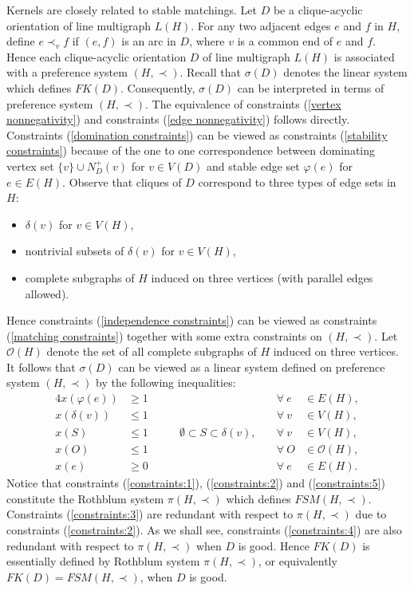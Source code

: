 \documentclass[11pt]{article}
\numberwithin{theorem}{section}
\begin{document}
Kernels are closely related to stable matchings. Let $D$ be a clique-acyclic orientation of line multigraph $L(H)$. 
For any two adjacent edges $e$ and $f$ in $H$, define $e\prec_v f$ if $(e,f)$ is an arc in $D$, where $v$ is a common end of $e$ and $f$.
Hence each clique-acyclic orientation $D$ of line multigraph $L(H)$ is associated with a preference system $(H,\prec)$.
Recall that $\sigma(D)$ denotes the linear system which defines $FK(D)$. Consequently, $\sigma(D)$ can be interpreted in terms of preference system $(H,\prec)$. The equivalence of constraints (\ref{vertex nonnegativity}) and constraints (\ref{edge nonnegativity}) follows directly. Constraints (\ref{domination constraints}) can be viewed as constraints (\ref{stability constraints}) because of the one to one correspondence between dominating vertex set $\{v\}\cup N^+_D(v)$ for $v\in V(D)$ and stable edge set $\varphi(e)$ for $e\in E(H)$.
Observe that cliques of $D$ correspond to three types of edge sets in $H$:
\begin{itemize}
\item $\delta(v)$ for $v\in V(H)$,
\item nontrivial subsets of $\delta(v)$ for $v\in V(H)$,
\item complete subgraphs of $H$ induced on three vertices (with parallel edges allowed).
\end{itemize}
Hence constraints (\ref{independence constraints}) can be viewed as constraints (\ref{matching constraints}) together with some extra constraints on $(H,\prec)$. Let $\mathcal{O}(H)$ denote the set of all complete subgraphs of $H$ induced on three vertices. It follows that $\sigma(D)$ can be viewed as a linear system defined on preference system $(H,\prec)$ by the following inequalities:
\begin{alignat}{4}
x(\varphi(e)) &\geq 1 &\qquad &\forall ~e &\in E(H),\label{constraints:1}\\
x(\delta(v)) &\leq 1 &\qquad &\forall ~v &\in V(H),\label{constraints:2}\\
x(S) &\leq 1 &\qquad \emptyset\subset S\subset \delta(v),\quad &\forall ~v&\in V(H),\label{constraints:3}\\
x(O) &\leq 1 &\qquad &\forall ~O&\in \mathcal{O}(H),\label{constraints:4}\\
x(e) &\geq 0 &\qquad &\forall ~e &\in E(H)\label{constraints:5}.
\end{alignat}
Notice that constraints (\ref{constraints:1}), (\ref{constraints:2}) and (\ref{constraints:5}) constitute the Rothblum system $\pi(H,\prec)$ which defines $FSM(H,\prec)$. Constraints (\ref{constraints:3}) are redundant with respect to $\pi(H,\prec)$ due to constraints (\ref{constraints:2}). As we shall see, constraints (\ref{constraints:4}) are also redundant with respect to $\pi(H,\prec)$ when $D$ is good. Hence $FK(D)$ is essentially defined by Rothblum system $\pi(H,\prec)$, or equivalently $FK(D)=FSM(H,\prec)$, when $D$ is good.
\end{document}
